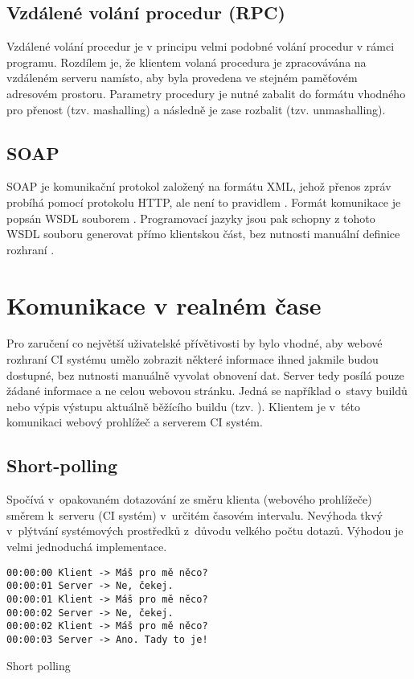 \subsection{Vzdálené volání procedur (RPC)}

Vzdálené volání procedur je v principu velmi podobné volání procedur v rámci programu.
Rozdílem je, že klientem volaná procedura je zpracovávána na vzdáleném serveru namísto, aby byla provedena ve stejném paměťovém adresovém prostoru.
Parametry procedury je nutné zabalit do formátu vhodného pro přenost (tzv. mashalling) a následně je zase rozbalit (tzv. unmashalling).
\cite{rpc}

\subsection{SOAP}

SOAP je komunikační protokol založený na formátu XML, jehož přenos zpráv probíhá pomocí protokolu HTTP, ale není to pravidlem \cite{soap}.
Formát komunikace je popsán WSDL souborem \cite{wsdl}.
Programovací jazyky jsou pak schopny z tohoto WSDL souboru generovat přímo klientskou část, bez nutnosti manuální definice rozhraní \cite{php_wsdl}.

\section{Komunikace v realném čase}

Pro zaručení co největší uživatelské přívětivosti by bylo vhodné, aby webové rozhraní CI systému umělo zobrazit některé informace ihned jakmile budou dostupné, bez nutnosti manuálně vyvolat obnovení dat.
Server tedy posílá pouze žádané informace a ne celou webovou stránku.
Jedná se například o~stavy buildů nebo výpis výstupu aktuálně běžícího buildu (tzv. ).
Klientem je v~této komunikaci webový prohlížeč a serverem CI systém.

\subsection{Short-polling}

Spočívá v~opakovaném dotazování ze směru klienta (webového prohlížeče) směrem k~serveru (CI systém) v~určitém časovém intervalu.
Nevýhoda tkvý v~plýtvání systémových prostředků z~důvodu velkého počtu dotazů.
Výhodou je velmi jednoduchá implementace.


\begin{listing}[ht]
\begin{verbatim}
00:00:00 Klient -> Máš pro mě něco?
00:00:01 Server -> Ne, čekej.
00:00:01 Klient -> Máš pro mě něco?
00:00:02 Server -> Ne, čekej.
00:00:02 Klient -> Máš pro mě něco?
00:00:03 Server -> Ano. Tady to je!
\end{verbatim}
\caption{Short polling}
\end{listing}

